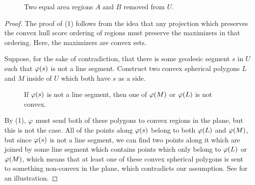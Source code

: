 \ifsmallfigs
\else
\begin{figure}[h]
	\centering
	
	\caption{Two equal area regions $A$ and $B$ removed from $U$.}
	\label{fig:ch_schema}
\end{figure}
\fi


\begin{proof}



		The proof of (1) follows from the idea that any projection which preserves the convex hull score ordering of regions must 
		preserve the maximizers in that ordering.   Here, the maximizers are convex sets.
		
		 Suppose, for the sake of contradiction, that there is some geodesic segment $s$ in $U$ such that $\varphi(s)$ is not a line segment. Construct two convex spherical polygons $L$ and $M$ inside of $U$ which both have $s$ as a side. 




\ifsmallfigs
\begin{figure}
	\centering
	\begin{minipage}{.5\textwidth}
		\centering
	\resizebox{.95\textwidth}{!}{}	
	\label{fig:ch_schema}
	\end{minipage}%
	\begin{minipage}{.5\textwidth}
		\centering
		\resizebox{1.15\textwidth}{!}{}
\label{fig:lineconvexcont}
	\end{minipage}
\end{figure}
\fi





		
\ifsmallfigs
\else		
\begin{figure}[h]
	\centering
	
	\caption{If $\varphi(s)$ is not a line segment, then one of $\varphi(M)$ or $\varphi(L)$ is not convex.}
	\label{fig:lineconvexcont}
\end{figure}
\fi
		 By (1), $\varphi$ must send both of these polygons to convex regions in the plane, but this is not the case.  All of the points along $\varphi(s)$ belong to both $\varphi(L)$ and $\varphi(M)$, but since $\varphi(s)$ is not a line segment, we can find two points along it which are joined by some line segment which contains points which only belong to $\varphi(L)$ or $\varphi(M)$, which means that at least one of these convex spherical polygons is sent to something non-convex in the plane, which contradicts our assumption.		See  for an illustration.
		

\end{proof}
